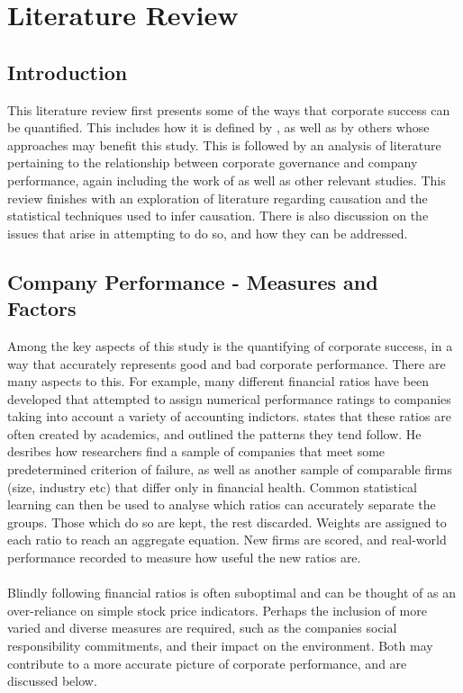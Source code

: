 %
%
%
\chapter{Literature Review}\label{C.LitReview}
\section{Introduction}\label{S.intro3}
{This literature review first presents some of the ways that corporate success can be quantified. This includes how it is defined by \cite{moldovan2015learning}, as well as by others whose approaches may benefit this study. This is followed by an analysis of literature pertaining to the relationship between corporate governance and company performance, again including the work of \cite{moldovan2015learning} as well as other relevant studies. This review finishes with an exploration of literature regarding causation and the statistical techniques used to infer causation. There is also discussion on the issues that arise in attempting to do so, and how they can be addressed. }
\section{Company Performance - Measures and \\ Factors}
{Among the key aspects of this study is the quantifying of corporate success, in a way that accurately   represents good and bad corporate performance. There are many aspects to this. For example, many different financial ratios have been developed that attempted to assign numerical performance ratings to companies taking into account a variety of accounting indictors. \cite {eidleman1995z} states that these ratios are often created by academics, and outlined the patterns they tend follow. He desribes how researchers find a sample of companies that meet some predetermined criterion of failure, as well as another sample of comparable firms (size, industry etc) that differ only in financial health. Common statistical learning can then be used to analyse which ratios can accurately separate the groups. Those which do so are kept, the rest discarded. Weights are assigned to each ratio to reach an aggregate equation. New firms are scored, and real-world performance recorded to measure how useful the new ratios are. \\\\
Blindly following financial ratios is often suboptimal and can be thought of as an over-reliance on simple stock price indicators. Perhaps the inclusion of more varied and diverse measures are required, such as the companies social responsibility commitments, and their impact on the environment. Both may contribute to a more accurate picture of corporate performance, and are discussed below.       }
